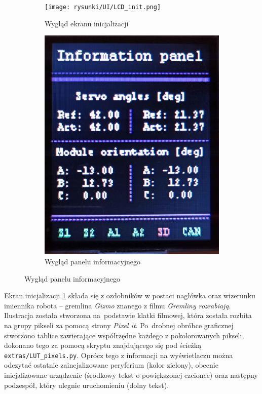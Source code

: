     \begin{figure}[ht!]
        \centering
        \begin{subfigure}[b]{0.45\textwidth}
            \centering
            \texttt{[image: rysunki/UI/LCD\_init.png]}
            \caption{\label{fig: lcd_init}Wygląd ekranu inicjalizacji}
        \end{subfigure}
        \hfill
        \begin{subfigure}[b]{0.45\textwidth}
            \centering
            \includegraphics[width=\textwidth]{rysunki/UI/LCD_info.png}
            \caption{\label{fig: lcd_info}Wygląd panelu informacyjnego}
        \end{subfigure}
    \end{figure} 

Ekran inicjalizacji \ref{fig: lcd_init} składa się z ozdobników w postaci nagłówka oraz wizerunku imiennika robota -- gremlina \textit{Gizmo} znanego z filmu \textit{Gremliny rozrabiają}. Ilustracja została stworzona na~podstawie klatki filmowej, która została rozbita na grupy pikseli za pomocą strony \textit{Pixel it}. Po~drobnej obróbce graficznej stworzono tablice zawierające współrzędne każdego z pokolorowanych pikseli, dokonano tego za pomocą skryptu znajdującego się pod ścieżką \texttt{extras/LUT\_pixels.py}. Oprócz tego z informacji na wyświetlaczu można odczytać ostatnie zaincjalizowane peryferium (kolor zielony), obecnie inicjalizowane urządzenie (środkowy tekst o powiększonej czcionce) oraz następny podzespół, który ulegnie uruchomieniu (dolny tekst). 

